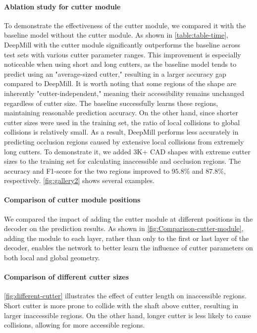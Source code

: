 \paragraph{Ablation study for cutter module}
To demonstrate the effectiveness of the cutter module, we compared it with the baseline model without the cutter module. As shown in \autoref{table:table-time}, DeepMill with the cutter module significantly outperforms the baseline across test sets with various cutter parameter ranges. 
This improvement is especially noticeable when using short and long cutters, as the baseline model tends to predict using an "average-sized cutter," resulting in a larger accuracy gap compared to DeepMill.
It is worth noting that some regions of the shape are inherently "cutter-independent," meaning their accessibility remains unchanged regardless of cutter size. The baseline successfully learns these regions, maintaining reasonable prediction accuracy. 
On the other hand, since shorter cutter sizes were used in the training set, the ratio of local collisions to global collisions is relatively small. As a result, DeepMill performs less accurately in predicting occlusion regions caused by extensive local collisions from extremely long cutters.
To demonstrate it, we added 3K+ CAD shapes with extreme cutter sizes to the training set for calculating inaccessible and occlusion regions. The accuracy and F1-score for the two regions improved to $95.8\%$ and $87.8\%$, respectively. \autoref{fig:gallery2} shows several examples.


\paragraph{Comparison of cutter module positions}
We compared the impact of adding the cutter module at different positions in the decoder on the prediction results. As shown in \autoref{fig:Comparison-cutter-module}, adding the module to each layer, rather than only to the first or last layer of the decoder, enables the network to better learn the influence of cutter parameters on both local and global geometry.

\paragraph{Comparison of different cutter sizes}
\autoref{fig:different-cutter} illustrates the effect of cutter length on inaccessible regions. Short cutter is more prone to collide with the shaft above cutter, resulting in larger inaccessible regions. On the other hand, longer cutter is less likely to cause collisions, allowing for more accessible regions.

